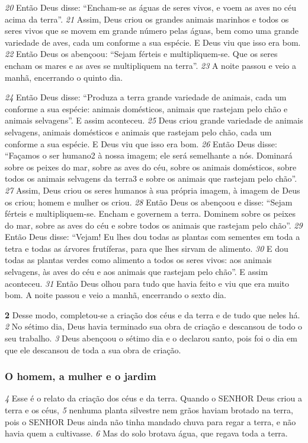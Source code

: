 \bigskip
\textit{\tiny 20}
Então Deus disse: “Encham-se as águas de seres vivos, e voem as aves no céu acima da terra”. 
\textit{\tiny 21}
Assim, Deus criou os grandes animais marinhos e todos os seres vivos que se movem em grande número pelas águas, bem como uma grande variedade de aves, cada um conforme a sua espécie. E Deus viu que isso era bom. 
\textit{\tiny 22}
Então Deus os abençoou: “Sejam férteis e multipliquem-se. Que os seres encham os mares e as aves se multipliquem na terra”.
\textit{\tiny 23}
A noite passou e veio a manhã, encerrando o quinto dia.

\bigskip
\textit{\tiny 24}
Então Deus disse: “Produza a terra grande variedade de animais, cada um conforme a sua espécie: animais domésticos, animais que rastejam pelo chão e animais selvagens”. E assim aconteceu. 
\textit{\tiny 25}
Deus criou grande variedade de animais selvagens, animais domésticos e animais que rastejam pelo chão, cada um conforme a sua espécie. E Deus viu que isso era bom.
\textit{\tiny 26}
Então Deus disse: “Façamos o ser humano2 à nossa imagem; ele será semelhante a nós. Dominará sobre os peixes do mar, sobre as aves do céu, sobre os animais domésticos, sobre todos os animais selvagens da terra3 e sobre os animais que rastejam pelo chão”.
\textit{\tiny 27}
Assim, Deus criou os seres humanos à sua própria imagem, à imagem de Deus os criou; homem e mulher os criou.
\textit{\tiny 28}
Então  Deus os abençoou e disse: “Sejam férteis e multipliquem-se. Encham e governem a terra. Dominem sobre os peixes do mar, sobre as aves do céu e sobre todos os animais que rastejam pelo chão”.
\textit{\tiny 29}
Então Deus disse: “Vejam! Eu lhes dou todas as plantas com sementes em toda a tetra e todas as árvores frutíferas, para que lhes sirvam de alimento. 
\textit{\tiny 30}
E dou todas as plantas verdes como alimento a todos os seres vivos: aos animais selvagens, às aves do céu e aos animais que rastejam pelo chão”. E assim aconteceu.
\textit{\tiny 31}
Então Deus olhou para tudo que havia feito e viu que era muito bom. A noite passou e veio a manhã, encerrando o sexto dia.

\bigskip
\textbf{\large 2} 
Desse modo, completou-se a criação dos céus e da terra e de tudo que neles há. 
\textit{\tiny 2}
No sétimo dia, Deus havia terminado sua obra de criação e descansou de todo o seu trabalho. 
\textit{\tiny 3}
Deus abençoou o sétimo dia e o declarou santo, pois foi o dia em que ele descansou de toda a sua obra de criação.

\bigskip
\subsubsection*{O homem, a mulher e o jardim}
\textit{\tiny 4}
Esse é o relato da criação dos céus e da terra. Quando o SENHOR Deus criou a terra e os céus, 
\textit{\tiny 5}
nenhuma planta silvestre nem grãos haviam brotado na terra, pois o SENHOR Deus ainda não tinha mandado
chuva para regar a terra, e não havia quem a cultivasse. 
\textit{\tiny 6}
Mas do solo brotava água, que regava toda a terra. 

